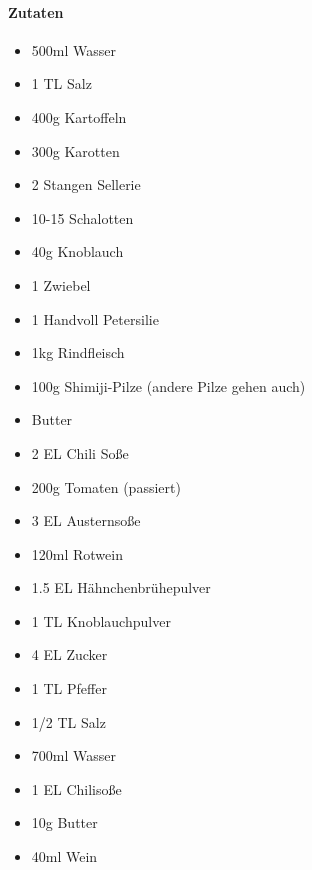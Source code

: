 \newpage
{}
\paragraph{Zutaten}
\begin{itemize}[noitemsep]
	\item 500ml Wasser
	\item 1 TL Salz
	\item 400g Kartoffeln
	\item 300g Karotten
	\item 2 Stangen Sellerie
	\item 10-15 Schalotten
	\item 40g Knoblauch
	\item 1 Zwiebel 
	\item 1 Handvoll Petersilie
	\item 1kg Rindfleisch
	\item 100g Shimiji-Pilze (andere Pilze gehen auch)
	\item Butter
	\item 2 EL Chili Soße
	\item 200g Tomaten (passiert)
	\item 3 EL Austernsoße
	\item 120ml Rotwein
	\item 1.5 EL Hähnchenbrühepulver
	\item 1 TL Knoblauchpulver
	\item 4 EL Zucker
	\item 1 TL Pfeffer 
	\item 1/2 TL Salz
	\item 700ml Wasser
	\item 1 EL Chilisoße
	\item 10g Butter
	\item 40ml Wein 
\end{itemize}
